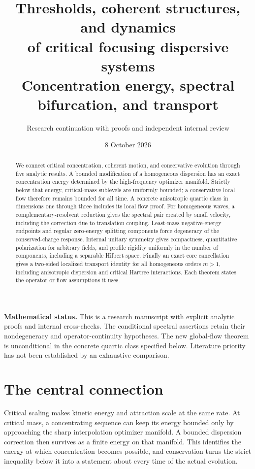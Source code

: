 \documentclass[11pt,a4paper]{article}
\title{Thresholds, coherent structures, and dynamics\\of critical focusing dispersive systems\\[5pt]
\large Concentration energy, spectral bifurcation, and transport}
\author{Research continuation with proofs and independent internal review}
\date{8 October 2026}
\theoremstyle{remark}\newtheorem{remark}[theorem]{Remark}
\begin{document}
\maketitle
\begin{abstract}
We connect critical concentration, coherent motion, and conservative
evolution through five analytic results. A bounded modification of a
homogeneous dispersion has an exact concentration energy determined by
the high-frequency optimizer manifold. Strictly below that energy,
critical-mass sublevels are uniformly bounded; a conservative local flow
therefore remains bounded for all time. A concrete anisotropic quartic
class in dimensions one through three includes its local flow proof.
For homogeneous waves, a complementary-resolvent reduction gives the
spectral pair created by small velocity, including the correction due to
translation coupling. Least-mass negative-energy endpoints and regular
zero-energy splitting components force degeneracy of the conserved-charge
response. Internal unitary symmetry gives compactness, quantitative
polarization for arbitrary fields, and profile rigidity uniformly in the
number of components, including a separable Hilbert space. Finally an
exact core cancellation gives a two-sided
localized transport identity for all homogeneous orders $m>1$, including
anisotropic dispersion and critical Hartree interactions. Each theorem
states the operator or flow assumptions it uses.
\end{abstract}

\noindent\textbf{Mathematical status.}
This is a research manuscript with explicit analytic proofs and internal
cross-checks. The conditional spectral assertions retain their
nondegeneracy and operator-continuity hypotheses. The new global-flow
theorem is unconditional in the concrete quartic class specified below.
Literature priority has not been established by an exhaustive comparison.

\section*{The central connection}
Critical scaling makes kinetic energy and attraction scale at the same
rate. At critical mass, a concentrating sequence can keep its energy
bounded only by approaching the sharp interpolation optimizer manifold.
A bounded dispersion correction then survives as a finite energy on that
manifold. This identifies the energy at which concentration becomes
possible, and conservation turns the strict inequality below it into a
statement about every time of the actual evolution.
\end{document}
